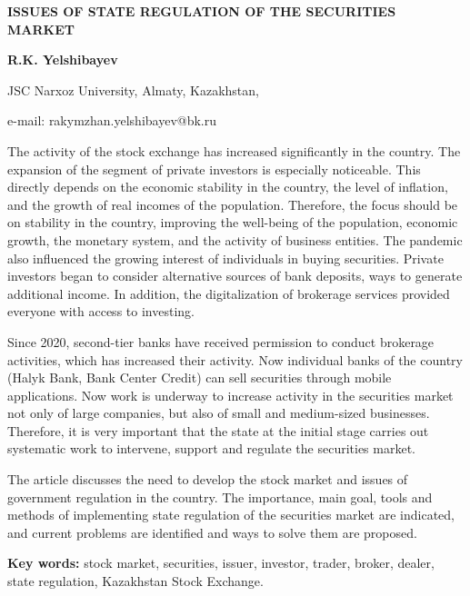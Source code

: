 {\bfseries ISSUES OF STATE REGULATION OF THE SECURITIES MARKET}

{\bfseries R.K. Yelshibayev}

JSC Narxoz University, Almaty, Kazakhstan,

e-mail: rakymzhan.yelshibayev@bk.ru

The activity of the stock exchange has increased significantly in the
country. The expansion of the segment of private investors is especially
noticeable. This directly depends on the economic stability in the
country, the level of inflation, and the growth of real incomes of the
population. Therefore, the focus should be on stability in the country,
improving the well-being of the population, economic growth, the
monetary system, and the activity of business entities. The pandemic
also influenced the growing interest of individuals in buying
securities. Private investors began to consider alternative sources of
bank deposits, ways to generate additional income. In addition, the
digitalization of brokerage services provided everyone with access to
investing.

Since 2020, second-tier banks have received permission to conduct
brokerage activities, which has increased their activity. Now individual
banks of the country (Halyk Bank, Bank Center Credit) can sell
securities through mobile applications. Now work is underway to increase
activity in the securities market not only of large companies, but also
of small and medium-sized businesses. Therefore, it is very important
that the state at the initial stage carries out systematic work to
intervene, support and regulate the securities market.

The article discusses the need to develop the stock market and issues of
government regulation in the country. The importance, main goal, tools
and methods of implementing state regulation of the securities market
are indicated, and current problems are identified and ways to solve
them are proposed.

{\bfseries Key words:} stock market, securities, issuer, investor, trader,
broker, dealer, state regulation, Kazakhstan Stock Exchange.

